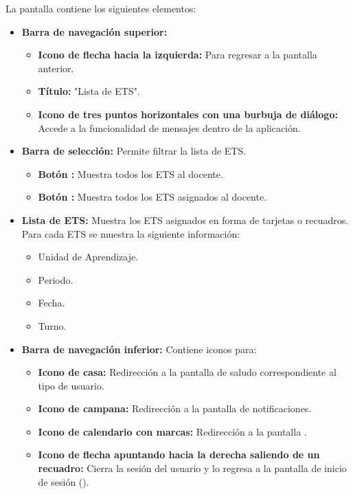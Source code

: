 La pantalla contiene los siguientes elementos:
\begin{itemize}
	\item \textbf{Barra de navegación superior:}
	\begin{itemize}
		\item \textbf{Icono de flecha hacia la izquierda:} Para regresar a la pantalla anterior.
		\item \textbf{Título:} "Lista de ETS".
		\item \textbf{Icono de tres puntos horizontales con una burbuja de diálogo:} Accede a la funcionalidad de mensajes dentro de la aplicación.
	\end{itemize}
	\item \textbf{Barra de selección:} Permite filtrar la lista de ETS.
	\begin{itemize}
		\item \textbf{Botón :} Muestra todos los ETS al docente.
		\item \textbf{Botón :} Muestra todos los ETS asignados al docente.
	\end{itemize}
	\item \textbf{Lista de ETS:} Muestra los ETS asignados en forma de tarjetas o recuadros. Para cada ETS se muestra la siguiente información:
	\begin{itemize}
		\item Unidad de Aprendizaje.
		\item Periodo.
		\item Fecha.
		\item Turno.
	\end{itemize}
	\item \textbf{Barra de navegación inferior:} Contiene iconos para:
	\begin{itemize}
		\item \textbf{Icono de casa:} Redirección a la pantalla de saludo correspondiente al tipo de usuario.
		\item \textbf{Icono de campana:} Redirección a la pantalla de notificaciones.
		\item \textbf{Icono de calendario con marcas:} Redirección a la pantalla .
		\item \textbf{Icono de flecha apuntando hacia la derecha saliendo de un recuadro:} Cierra la sesión del usuario y lo regresa a la pantalla de inicio de sesión ().
	\end{itemize}
\end{itemize}

